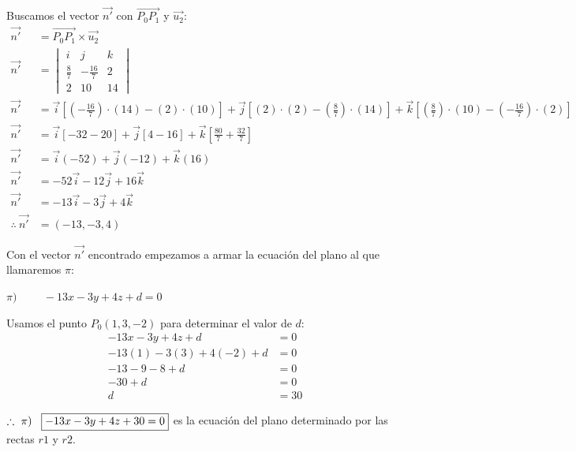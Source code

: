 \noindent Buscamos el vector $\vec{n'}$ con $\overrightarrow{P_0P_1}$ y $\vec{u_2}$:
\begin{align*}
	\vec{n'}              & = \overrightarrow{P_0P_1} \times \vec{u_2}                         \\
	\vec{n'}              & = \begin{vmatrix}
		                          i           & j             & k  \\
		                          \frac{8}{7} & -\frac{16}{7} & 2  \\
		                          2           & 10            & 14
	                          \end{vmatrix}                                 \\
	\vec{n'}              & = \vec{i} \left[(-\frac{16}{7})\cdot(14) - (2)\cdot(10) \right]  +
	\vec{j} \left[ (2)\cdot(2) - (\frac{8}{7})\cdot(14) \right] +
	\vec{k} \left[ (\frac{8}{7})\cdot(10) - (-\frac{16}{7})\cdot(2) \right]                    \\
	\vec{n'}              & = \vec{i} \left[-32 - 20 \right]  +
	\vec{j} \left[ 4 - 16 \right] +
	\vec{k} \left[ \frac{80}{7} + \frac{32}{7} \right]                                         \\
	\vec{n'}              & = \vec{i} (-52) + \vec{j} (- 12) + \vec{k} (16)                    \\
	\vec{n'}              & = -52\vec{i}- 12\vec{j} + 16\vec{k}                                \\
	\vec{n'}              & = -13\vec{i}- 3\vec{j} + 4\vec{k}                                  \\
	\therefore \ \vec{n'} & = \boxed{(-13, -3, 4)}
\end{align*}

\noindent Con el vector $\vec{n'}$ encontrado empezamos a armar la ecuación del plano al que llamaremos $\pi$:
\begin{center}
	$\pi) \hspace{1cm} -13x - 3y + 4z + d = 0$
\end{center}

\noindent Usamos el punto $P_0(1, 3, -2)$ para determinar el valor de $d$:
\begin{align*}
	-13x - 3y + 4z + d        & = 0          \\
	-13(1) - 3(3) + 4(-2) + d & = 0          \\
	-13 - 9 - 8 + d           & = 0          \\
	-30 + d                   & = 0          \\
	d                         & = \boxed{30}
\end{align*}

$\therefore \ \pi) \hspace{0.3cm} \boxed{-13x - 3y + 4z + 30 = 0}$ es la ecuación del plano determinado por las rectas $r1$ y $r2$.
